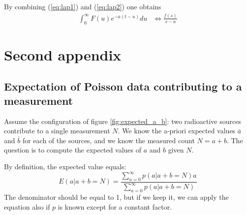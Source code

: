 \documentclass[11pt,oneside]{book}
\begin{document}
By combining (\ref{eq:lap1}) and (\ref{eq:lap2}) one obtains
\begin{align}
\int_0^\infty F(u) e^{-a(t - u)} du & \Longleftrightarrow \frac{f(s)}{s-a}
\end{align}

\chapter{Second appendix}

\section{Expectation of Poisson data contributing to a measurement} \label{app:expected_a_b}
Assume the configuration of figure \ref{fig:expected_a_b}: two radioactive
sources contribute to a single measurement $N$. We know the a-priori expected
values $\bar{a}$ and $\bar{b}$ for each of the sources, and we know the
measured count $N = a + b$. The question is to compute the expected values of
$a$ and $b$ given $N$.

 By definition, the expected value equals:
\begin{equation}
  E(a | a + b = N) = \frac{\sum_{a=0}^\infty p(a | a + b = N) a}
                          {\sum_{a=0}^\infty p(a | a + b = N)}
  \label{eq:appab1}
\end{equation}
The denominator should be equal to 1, but if we keep it, we can apply the
equation also if $p$ is known except for a constant factor.
\end{document}
